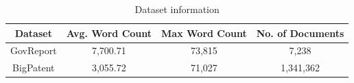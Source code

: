 \begin{table}[!ht]
	\centering

	\begin{tabular}{c c c c}
		\hline
		\textbf{Dataset} & \textbf{Avg. Word Count} & \textbf{Max Word Count} &
		\textbf{No. of Documents} \\
		\hline
		GovReport & 7,700.71 & 73,815 & 7,238 \\
		BigPatent & 3,055.72 & 71,027 & 1,341,362 \\
		\hline
	\end{tabular}

	\caption{Dataset information}
	\label{tab:datasets}
\end{table}
